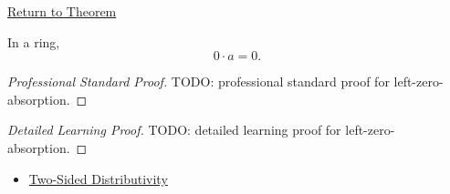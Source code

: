 \newpage
{}
\label{prf:left-zero-absorption}

\begin{remark*}[Return]
\hyperref[prop:left-zero-absorption]{Return to Theorem}
\end{remark*}

\begin{proposition*}
In a ring,
\[
0\cdot a=0.
\]
\end{proposition*}

\begin{proof}[Professional Standard Proof]
\LRAProofBodyStart
TODO: professional standard proof for left-zero-absorption.
\end{proof}

\begin{proof}[Detailed Learning Proof]
\LRAProofBodyStart
TODO: detailed learning proof for left-zero-absorption.
\end{proof}

\begin{remark*}
\end{remark*}

\begin{dependencies}
\begin{itemize}
  \item \hyperref[def:two-sided-distributivity]{Two-Sided Distributivity}
\end{itemize}
\end{dependencies}

\clearpage
